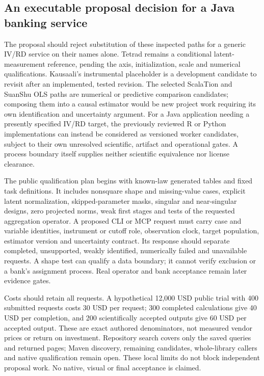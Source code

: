 \subsection{An executable proposal decision for a Java banking service}

The proposal should reject substitution of these inspected paths for a generic IV/RD service on their names alone. Tetrad remains a conditional latent-measurement reference, pending the axis, initialization, scale and numerical qualifications. Kausaali's instrumental placeholder is a development candidate to revisit after an implemented, tested revision. The selected ScalaTion and SuanShu OLS paths are numerical or predictive comparison candidates; composing them into a causal estimator would be new project work requiring its own identification and uncertainty argument. For a Java application needing a presently specified IV/RD target, the previously reviewed R or Python implementations can instead be considered as versioned worker candidates, subject to their own unresolved scientific, artifact and operational gates. A process boundary itself supplies neither scientific equivalence nor license clearance.\citep{exec25_javaiv_choice,exec25_pyrdiv_choice}

The public qualification plan begins with known-law generated tables and fixed task definitions. It includes nonsquare shape and missing-value cases, explicit latent normalization, skipped-parameter masks, singular and near-singular designs, zero projected norms, weak first stages and tests of the requested aggregation operator. A proposed CLI or MCP request must carry case and variable identities, instrument or cutoff role, observation clock, target population, estimator version and uncertainty contract. Its response should separate completed, unsupported, weakly identified, numerically failed and unavailable requests. A shape test can qualify a data boundary; it cannot verify exclusion or a bank's assignment process. Real operator and bank acceptance remain later evidence gates.

Costs should retain all requests. A hypothetical 12,000 USD public trial with 400 submitted requests costs 30 USD per request; 300 completed calculations give 40 USD per completion, and 200 scientifically accepted outputs give 60 USD per accepted output. These are exact authored denominators, not measured vendor prices or return on investment. Repository search covers only the saved queries and returned pages; Maven discovery, remaining candidates, whole-library callers and native qualification remain open. These local limits do not block independent proposal work. No native, visual or final acceptance is claimed.\citep{exec25_javaiv_choice}
